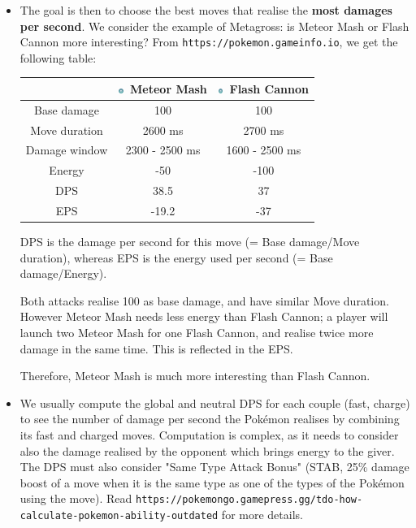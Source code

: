 \documentclass[8pt,aspectratio=169,compress]{beamer}
\newcommand{\steelsimp}{\includegraphics[height=0.15cm]{../../images/type/simplified/steel.png}}
\begin{document}
\begin{frame}
\begin{block}{}
\begin{tiny}
\begin{itemize}
  \item The goal is then to choose the best moves that realise the \textbf{most damages per second}. We consider the example of Metagross: is Meteor Mash or Flash Cannon more interesting? From \texttt{https://pokemon.gameinfo.io}, we get the following table:
  \begin{center}
\begin{tabular}{ccc}
& \steelsimp~Meteor Mash & \steelsimp~Flash Cannon \\ \hline
Base damage& 100 &100 \\
Move duration & 2600 ms & 2700 ms \\
Damage window &2300 - 2500 ms & 1600 - 2500 ms \\
Energy& -50 & -100  \\ \hline
DPS	& 38.5 & 37 \\
EPS & -19.2 &-37 \\
\end{tabular}
\end{center}

DPS is the damage per second for this move (= Base damage/Move duration), whereas EPS is the energy used per second (= Base damage/Energy).

Both attacks realise 100 as base damage, and have similar Move duration. However Meteor Mash needs less energy than Flash Cannon; a player will launch two Meteor Mash for one Flash Cannon, and realise twice more damage in the same time. This is reflected in the EPS.

Therefore, Meteor Mash is much more interesting than Flash Cannon.
\item We usually compute the global and neutral DPS for each couple (fast, charge) to see the number of damage per second the Pok\'emon realises by combining its fast and charged moves. Computation is complex, as it needs to consider also the damage realised by the opponent which brings energy to the giver. The DPS must also consider  "Same Type Attack Bonus" (STAB, 25\% damage boost of a move when it is the same type as one of the types of the Pokémon using the move). Read \texttt{https://pokemongo.gamepress.gg/tdo-how-calculate-pokemon-ability-outdated} for more details.


\end{itemize}
\end{tiny}
\end{block}
\end{frame}
\end{document}
